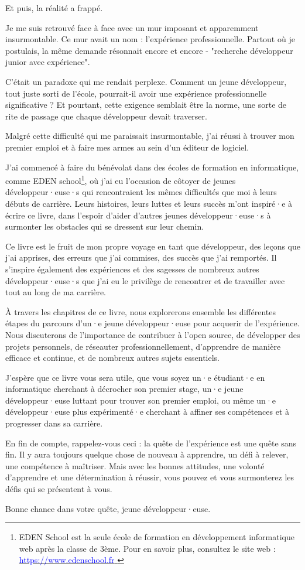 Et puis, la réalité a frappé.

Je me suis retrouvé face à face avec un mur imposant et apparemment insurmontable. Ce mur avait un nom : l'expérience professionnelle. Partout où je postulais, la même demande résonnait encore et encore - "recherche développeur junior avec expérience".

C'était un paradoxe qui me rendait perplexe. Comment un jeune développeur, tout juste sorti de l'école, pourrait-il avoir une expérience professionnelle significative ? Et pourtant, cette exigence semblait être la norme, une sorte de rite de passage que chaque développeur devait traverser.

Malgré cette difficulté qui me paraissait insurmontable, j'ai réussi à trouver mon premier emploi et à faire mes armes au sein d'un éditeur de logiciel.

J'ai commencé à faire du bénévolat dans des écoles de formation en informatique, comme EDEN school\footnote{EDEN School est la seule école de formation en développement informatique web après la classe de 3ème. Pour en savoir plus, consultez le site web : \href{https://www.edenschool.fr}{ \textcolor{blue}{https://www.edenschool.fr} }}, où j'ai eu l'occasion de côtoyer de jeunes développeur·euse·s qui rencontraient les mêmes difficultés que moi à leurs débuts de carrière. Leurs histoires, leurs luttes et leurs succès m'ont inspiré·e à écrire ce livre, dans l'espoir d'aider d'autres jeunes développeur·euse·s à surmonter les obstacles qui se dressent sur leur chemin.

Ce livre est le fruit de mon propre voyage en tant que développeur, des leçons que j'ai apprises, des erreurs que j'ai commises, des succès que j'ai remportés. Il s'inspire également des expériences et des sagesses de nombreux autres développeur·euse·s que j'ai eu le privilège de rencontrer et de travailler avec tout au long de ma carrière.

À travers les chapitres de ce livre, nous explorerons ensemble les différentes étapes du parcours d'un·e jeune développeur·euse pour acquerir de l'expérience. Nous discuterons de l'importance de contribuer à l'open source, de développer des projets personnels, de réseauter professionnellement, d'apprendre de manière efficace et continue, et de nombreux autres sujets essentiels.

J'espère que ce livre vous sera utile, que vous soyez un·e étudiant·e en informatique cherchant à décrocher son premier stage, un·e jeune développeur·euse luttant pour trouver son premier emploi, ou même un·e développeur·euse plus expérimenté·e cherchant à affiner ses compétences et à progresser dans sa carrière.

En fin de compte, rappelez-vous ceci : la quête de l'expérience est une quête sans fin. Il y aura toujours quelque chose de nouveau à apprendre, un défi à relever, une compétence à maîtriser. Mais avec les bonnes attitudes, une volonté d'apprendre et une détermination à réussir, vous pouvez et vous surmonterez les défis qui se présentent à vous.

Bonne chance dans votre quête, jeune développeur·euse.


